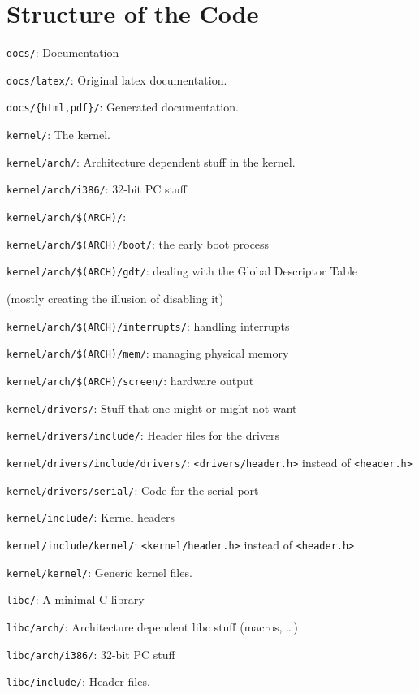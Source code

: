 \documentclass[12pt]{article}
\newcommand{\code}[1]{\colorbox{light-gray}{\texttt{#1}}}
\begin{document}
\section{Structure of the Code}
\begin{list}{}{}
\item \code{docs/}: Documentation
\item \code{docs/latex/}: Original latex documentation.
\item \code{docs/\{html,pdf\}/}: Generated documentation.
\item \code{kernel/}: The kernel.
\item \code{kernel/arch/}: Architecture dependent stuff in the kernel.
\item \code{kernel/arch/i386/}: 32-bit PC stuff
\item \code{kernel/arch/\$(ARCH)/}:
\item \code{kernel/arch/\$(ARCH)/boot/}: the early boot process
\item \code{kernel/arch/\$(ARCH)/gdt/}: dealing with the Global Descriptor Table \begin{small}(mostly creating the illusion of disabling it)\end{small}
\item \code{kernel/arch/\$(ARCH)/interrupts/}: handling interrupts
\item \code{kernel/arch/\$(ARCH)/mem/}: managing physical memory
\item \code{kernel/arch/\$(ARCH)/screen/}: hardware output
\item \code{kernel/drivers/}: Stuff that one might or might not want
\item \code{kernel/drivers/include/}: Header files for the drivers
\item \code{kernel/drivers/include/drivers/}: \code{<drivers/header.h>} instead of \code{<header.h>}
\item \code{kernel/drivers/serial/}: Code for the serial port
\item \code{kernel/include/}: Kernel headers
\item \code{kernel/include/kernel/}: \code{<kernel/header.h>} instead of \code{<header.h>}
\item \code{kernel/kernel/}: Generic kernel files.
\item \code{libc/}: A minimal C library
\item \code{libc/arch/}: Architecture dependent libc stuff (macros, …)
\item \code{libc/arch/i386/}: 32-bit PC stuff
\item \code{libc/include/}: Header files.

\end{list}
\end{document}
